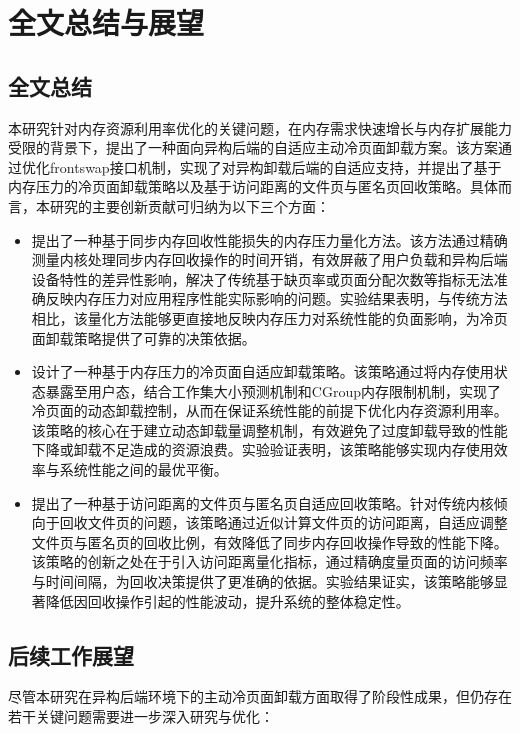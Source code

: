 \chapter{全文总结与展望}

\section{全文总结}
本研究针对内存资源利用率优化的关键问题，在内存需求快速增长与内存扩展能力受限的背景下，提出了一种面向异构后端的自适应主动冷页面卸载方案。该方案通过优化frontswap接口机制，实现了对异构卸载后端的自适应支持，并提出了基于内存压力的冷页面卸载策略以及基于访问距离的文件页与匿名页回收策略。具体而言，本研究的主要创新贡献可归纳为以下三个方面：

\begin{itemize}
    \item 提出了一种基于同步内存回收性能损失的内存压力量化方法。该方法通过精确测量内核处理同步内存回收操作的时间开销，有效屏蔽了用户负载和异构后端设备特性的差异性影响，解决了传统基于缺页率或页面分配次数等指标无法准确反映内存压力对应用程序性能实际影响的问题。实验结果表明，与传统方法相比，该量化方法能够更直接地反映内存压力对系统性能的负面影响，为冷页面卸载策略提供了可靠的决策依据。

    \item 设计了一种基于内存压力的冷页面自适应卸载策略。该策略通过将内存使用状态暴露至用户态，结合工作集大小预测机制和CGroup内存限制机制，实现了冷页面的动态卸载控制，从而在保证系统性能的前提下优化内存资源利用率。该策略的核心在于建立动态卸载量调整机制，有效避免了过度卸载导致的性能下降或卸载不足造成的资源浪费。实验验证表明，该策略能够实现内存使用效率与系统性能之间的最优平衡。

    \item 提出了一种基于访问距离的文件页与匿名页自适应回收策略。针对传统内核倾向于回收文件页的问题，该策略通过近似计算文件页的访问距离，自适应调整文件页与匿名页的回收比例，有效降低了同步内存回收操作导致的性能下降。该策略的创新之处在于引入访问距离量化指标，通过精确度量页面的访问频率与时间间隔，为回收决策提供了更准确的依据。实验结果证实，该策略能够显著降低因回收操作引起的性能波动，提升系统的整体稳定性。

\end{itemize}

\section{后续工作展望}
尽管本研究在异构后端环境下的主动冷页面卸载方面取得了阶段性成果，但仍存在若干关键问题需要进一步深入研究与优化：

